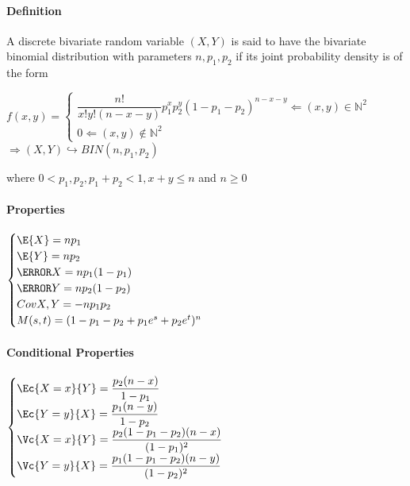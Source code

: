 \paragraph{Definition}
A discrete bivariate random variable $(X, Y )$ is said to have the 
bivariate binomial distribution with parameters $n, p_{1}, p_{2}$ if its
joint probability density is of the form
\begin{center}
	$f(x,y)=
	\begin{cases}	
		\dfrac{n!}{x!y!(n-x-y)}p_{1}^{x}p_{2}^{y}(1-p_{1}-p_{2})^{n-x-y}\Leftarrow (x,y)\in\mathbb{N}^{2}\\
		0\Leftarrow (x,y)\not\in\mathbb{N}^{2} 
	\end{cases}$	
	$\Rightarrow \left( X,Y \right)\hookrightarrow BIN(n,p_{1},p_{2})
	$
\end{center}
where $0<p_{1}, p_{2}, p_{1}+p_{2}<1, x+y\leq n$ and $n\geq 0$
\paragraph{Properties}
\begin{center}
	$
	\begin{cases}
	\E{X}=np_{1}\\
	\E{Y}=np_{2}\\
	\V{X}=np_{1}(1-p_{1})\\
	\V{Y}=np_{2}(1-p_{2})\\
	Cov{X,Y}=-np_{1}p_{2}\\
	M(s,t)=(1-p_{1}-p_{2}+p_{1}e^{s}+p_{2}e^{t})^{n}
	\end{cases}
	$
\end{center}
\paragraph{Conditional Properties}
\begin{center}
	$
	\begin{cases}
	\Ec{X=x}{Y}=\dfrac{p_{2}(n-x)}{1-p_{1}}\\
	\Ec{Y=y}{X}=\dfrac{p_{1}(n-y)}{1-p_{2}}\\
	\Vc{X=x}{Y}=\dfrac{p_{2}(1-p_{1}-p_{2})(n-x)}{(1-p_{1})^{2}}\\
	\Vc{Y=y}{X}=\dfrac{p_{1}(1-p_{1}-p_{2})(n-y)}{(1-p_{2})^{2}}
	\end{cases}
	$
\end{center}
